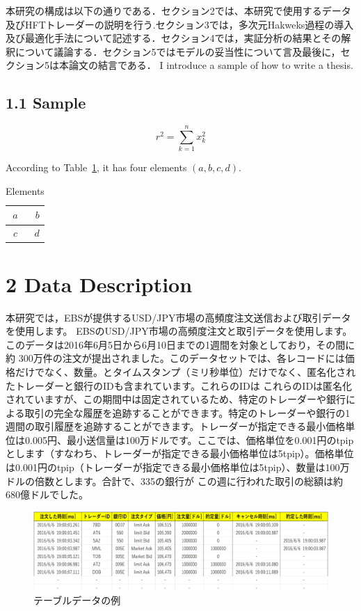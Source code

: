 \documentclass[a4paper,11pt,oneside,openany]{book}
\begin{document}
本研究の構成は以下の通りである．セクション2では、本研究で使用するデータ及びHFTトレーダーの説明を行う.セクション3では，多次元Hakweks過程の導入及び最適化手法について記述する．セクション4では，実証分析の結果とその解釈について議論する．セクション5ではモデルの妥当性について言及最後に，セクション5は本論文の結言である．
I introduce a sample of how to write a thesis\cite{1}.


\section*{1.1 Sample}


\begin{equation}
  r^2 = \sum_{k=1}^{n} x_k^2 \label{eq:hs}
\end{equation}


According to Table~\ref{tab:sample}, it has four elements $(a, b, c, d)$.
\begin{table}[htb]
  \centering
  \caption{Elements}\label{tab:sample}
  \begin{tabular}{|c|r|}
    \hline
    $a$ & $b$ \\ \hline
    $c$ & $d$ \\ \hline
  \end{tabular}
\end{table}


\chapter{2 Data Description}
本研究では，EBSが提供するUSD/JPY市場の高頻度注文送信および取引データを使用します。 EBSのUSD/JPY市場の高頻度注文と取引データを使用します。このデータは2016年6月5日から6月10日までの1週間を対象としており，その間に約 300万件の注文が提出されました。このデータセットでは、各レコードには価格だけでなく、数量。とタイムスタンプ（ミリ秒単位）だけでなく、匿名化されたトレーダーと銀行のIDも含まれています。これらのIDは これらのIDは匿名化されていますが、この期間中は固定されているため、特定のトレーダーや銀行による取引の完全な履歴を追跡することができます。特定のトレーダーや銀行の1週間の取引履歴を追跡することができます。トレーダーが指定できる最小価格単位は0.005円、最小送信量は100万ドルです。ここでは、価格単位を0.001円のtpipとします（すなわち、トレーダーが指定できる最小価格単位は5tpip）。価格単位は0.001円のtpip（トレーダーが指定できる最小価格単位は5tpip）、数量は100万ドルの倍数とします。合計で、335の銀行が この週に行われた取引の総額は約680億ドルでした。
\begin{figure}[htb]
  \centering
  \includegraphics[scale=0.7]{./figures/table_data.png}
  \caption{テーブルデータの例}\label{fig:hs}
\end{figure}
\end{document}
